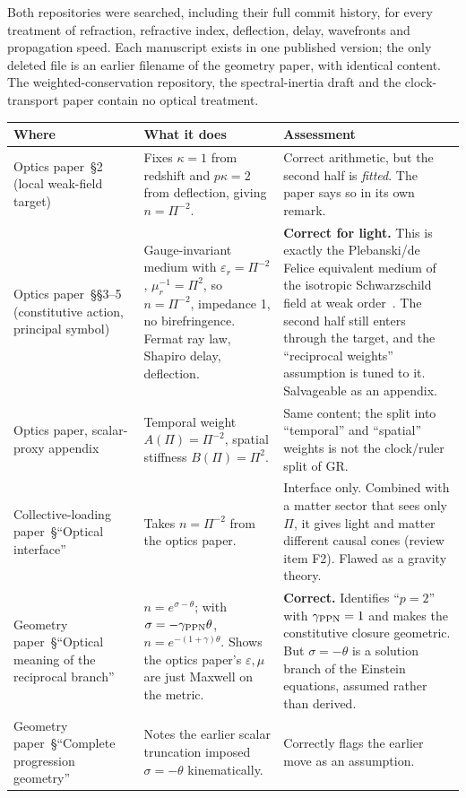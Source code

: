 \documentclass[11pt]{article}
\newcommand{\Pg}{\Pi}
\newcommand{\thP}{\theta}
\newcommand{\sgP}{\sigma}
\theoremstyle{plain}
\theoremstyle{remark}
\begin{document}
Both repositories were searched, including their full commit history, for every treatment of refraction, refractive index, deflection, delay, wavefronts and propagation speed. Each manuscript exists in one published version; the only deleted file is an earlier filename of the geometry paper, with identical content. The weighted-conservation repository, the spectral-inertia draft and the clock-transport paper contain no optical treatment.

\begin{longtable}{@{}p{}p{}p{}@{}}
\toprule
Where & What it does & Assessment \\
\midrule
Optics paper~\S2 (local weak-field target) & Fixes $\kappa=1$ from redshift and $p\kappa=2$ from deflection, giving $n=\Pg^{-2}$. & Correct arithmetic, but the second half is \emph{fitted}. The paper says so in its own remark. \\
Optics paper~\S\S3--5 (constitutive action, principal symbol) & Gauge-invariant medium with $\varepsilon_r=\Pg^{-2}$, $\mu_r^{-1}=\Pg^{2}$, so $n=\Pg^{-2}$, impedance 1, no birefringence. Fermat ray law, Shapiro delay, deflection. & \textbf{Correct for light.} This is exactly the Plebanski/de Felice equivalent medium of the isotropic Schwarzschild field at weak order~\cite{Plebanski1960,deFelice1971}. The second half still enters through the target, and the ``reciprocal weights'' assumption is tuned to it. Salvageable as an appendix. \\
Optics paper, scalar-proxy appendix & Temporal weight $A(\Pg)=\Pg^{-2}$, spatial stiffness $B(\Pg)=\Pg^{2}$. & Same content; the split into ``temporal'' and ``spatial'' weights is not the clock/ruler split of GR. \\
Collective-loading paper~\S``Optical interface'' & Takes $n=\Pg^{-2}$ from the optics paper. & Interface only. Combined with a matter sector that sees only $\Pg$, it gives light and matter different causal cones (review item F2). Flawed as a gravity theory. \\
Geometry paper~\S``Optical meaning of the reciprocal branch'' & $n=e^{\sgP-\thP}$; with $\sgP=-\gamma_{\rm PPN}\thP$, $n=e^{-(1+\gamma)\thP}$. Shows the optics paper's $\varepsilon,\mu$ are just Maxwell on the metric. & \textbf{Correct.} Identifies ``$p=2$'' with $\gamma_{\rm PPN}=1$ and makes the constitutive closure geometric. But $\sgP=-\thP$ is a solution branch of the Einstein equations, assumed rather than derived. \\
Geometry paper~\S``Complete progression geometry'' & Notes the earlier scalar truncation imposed $\sgP=-\thP$ kinematically. & Correctly flags the earlier move as an assumption. \\

\end{longtable}
\end{document}
